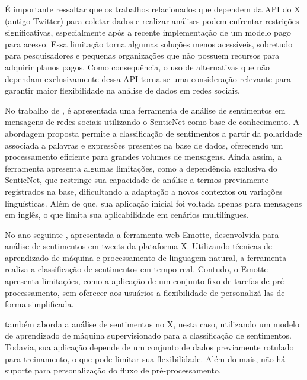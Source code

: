 \documentclass[
	12pt,				%
	oneside,			%
	a4paper,			%
	english,			%
	french,				%
	spanish,			%
	brazil				%
	]{abntex2}
\begin{document}
É importante ressaltar que os trabalhos relacionados que dependem da API
do X (antigo Twitter) para coletar dados e realizar análises podem
enfrentar restrições significativas, especialmente após a recente
implementação de um modelo pago para acesso. Essa limitação torna
algumas soluções menos acessíveis, sobretudo para pesquisadores e
pequenas organizações que não possuem recursos para adquirir planos
pagos. Como consequência, o uso de alternativas que não dependam
exclusivamente dessa API torna-se uma consideração relevante para
garantir maior flexibilidade na análise de dados em redes sociais.

No trabalho de , é apresentada uma
ferramenta de análise de sentimentos em mensagens de redes sociais
utilizando o SenticNet como base de conhecimento. A abordagem proposta
permite a classificação de sentimentos a partir da polaridade associada
a palavras e expressões presentes na base de dados, oferecendo um
processamento eficiente para grandes volumes de mensagens. Ainda assim,
a ferramenta apresenta algumas limitações, como a dependência exclusiva
do SenticNet, que restringe sua capacidade de análise a termos
previamente registrados na base, dificultando a adaptação a novos
contextos ou variações linguísticas. Além de que, sua aplicação inicial
foi voltada apenas para mensagens em inglês, o que limita sua
aplicabilidade em cenários multilíngues.

No ano seguinte , apresentada a
ferramenta web Emotte, desenvolvida para análise de sentimentos em
tweets da plataforma X. Utilizando técnicas de aprendizado de máquina e
processamento de linguagem natural, a ferramenta realiza a classificação
de sentimentos em tempo real. Contudo, o Emotte apresenta limitações,
como a aplicação de um conjunto fixo de tarefas de pré-processamento,
sem oferecer aos usuários a flexibilidade de personalizá-las de forma
simplificada.

 também aborda a análise de
sentimentos no X, nesta caso, utilizando um modelo de aprendizado de
máquina supervisionado para a classificação de sentimentos. Todavia, sua
aplicação depende de um conjunto de dados previamente rotulado para
treinamento, o que pode limitar sua flexibilidade. Além do mais, não há
suporte para personalização do fluxo de pré-processamento.
\end{document}
